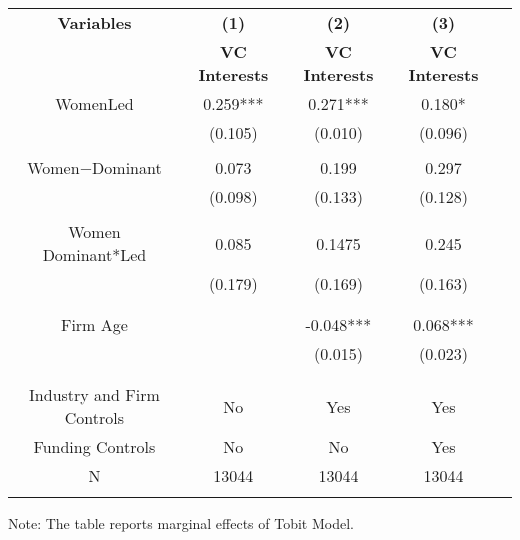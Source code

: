  \begin{table}[htbp]
    \begin{tabular}{c c c c c}
    \toprule
    \textbf{Variables} & \textbf{(1)} & \textbf{(2)} & \textbf{(3)}         \\ 
    \textbf & \textbf{VC Interests} & \textbf{VC Interests} & \textbf{VC Interests}   \\ 

    \midrule
    WomenLed         &   0.259*** &     0.271***    &        0.180*   \\
                        &   (0.105)  &      (0.010)    &        (0.096)  \\
                        &             &                &                  \\
    Women$-$Dominant    &    0.073    &      0.199     &        0.297  \\
                        &    (0.098)  &      (0.133)   &        (0.128)  \\
                        &             &                &                    \\
Women Dominant*Led      &    0.085     &    0.1475     &       0.245   \\
                        &   (0.179)   &     (0.169)    &      (0.163)  \\                    
                        &             &                &             \\
                        &             &                &                    \\
    Firm Age            &             &      -0.048*** &    0.068***        \\
                        &             &      (0.015)   &    (0.023)       \\
                        &             &                &                 \\
                        &             &                &                \\

Industry and Firm Controls   &   No        &   Yes       &          Yes    \\
    Funding Controls    &   No             &   No        &        Yes        \\

    \midrule
     N                  &   13044          &      13044  &     13044      \\          
    \bottomrule
  
    \addlinespace[1ex]
    \multicolumn{3}{l}{\textsuperscript{***}$P<0.01$, 
      \textsuperscript{**}$P<0.05$, 
      \textsuperscript{*}$P<0.1$}

\end{tabular}
\newline
Note: The table reports marginal effects of Tobit Model.

\end{table}
